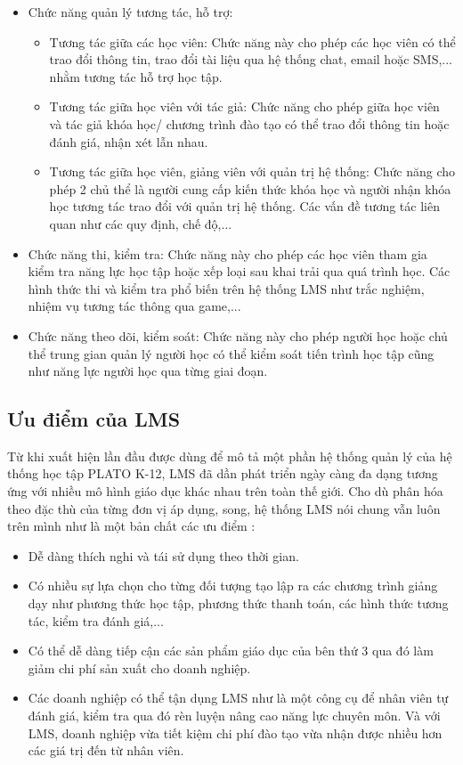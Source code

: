 \begin{itemize}
	\item Chức năng quản lý tương tác, hỗ trợ:
	\begin{itemize}
		\item Tương tác giữa các học viên: Chức năng này cho phép các học viên có thể trao đổi thông tin, trao đổi tài liệu qua hệ thống chat, email hoặc SMS,... nhằm tương tác hỗ trợ học tập.
		\item Tương tác giữa học viên với tác giả: Chức năng cho phép giữa học viên và tác giả khóa học/ chương trình đào tạo có thể trao đổi thông tin hoặc đánh giá, nhận xét lẫn nhau.
		\item Tương tác giữa học viên, giảng viên với quản trị hệ thống: Chức năng cho phép 2 chủ thể là người cung cấp kiến thức khóa học và người nhận khóa học tương tác trao đổi với quản trị hệ thống. Các vấn đề tương tác liên quan như các quy định, chế độ,...
	\end{itemize}
	\item Chức năng thi, kiểm tra: Chức năng này cho phép các học viên tham gia kiểm tra năng lực học tập hoặc xếp loại sau khai trải qua quá trình học. Các hình thức thi và kiểm tra phổ biến trên hệ thống LMS như trắc nghiệm, nhiệm vụ tương tác thông qua game,...
	\item Chức năng theo dõi, kiểm soát: Chức năng này cho phép người học hoặc chủ thể trung gian quản lý người học có thể kiểm soát tiến trình học tập cũng như năng lực người học qua từng giai đoạn.
\end{itemize}
\subsection{Ưu điểm của LMS}
Từ khi xuất hiện lần đầu được dùng để mô tả một phần hệ thống quản lý của hệ thống học tập PLATO K-12, LMS đã dần phát triển ngày càng đa dạng tương ứng với nhiều mô hình giáo dục khác nhau trên toàn thế giới. Cho dù phân hóa theo đặc thù của từng đơn vị áp dụng, song, hệ thống LMS nói chung vẫn luôn trên mình như là một bản chất các ưu điểm \cite{lms}:
\begin{itemize}
	\item Dễ dàng thích nghi và tái sử dụng theo thời gian.
	\item Có nhiều sự lựa chọn cho từng đối tượng tạo lập ra các chương trình giảng dạy như phương thức học tập, phương thức thanh toán, các hình thức tương tác, kiểm tra đánh giá,...
	\item Có thể dễ dàng tiếp cận các sản phẩm giáo dục của bên thứ 3 qua đó làm giảm chi phí sản xuất cho doanh nghiệp.
	\item Các doanh nghiệp có thể tận dụng LMS như là một công cụ để nhân viên tự đánh giá, kiểm tra qua đó rèn luyện nâng cao năng lực chuyên môn. Và với LMS, doanh nghiệp vừa tiết kiệm chi phí đào tạo vừa nhận được nhiều hơn các giá trị đến từ nhân viên.
\end{itemize}

